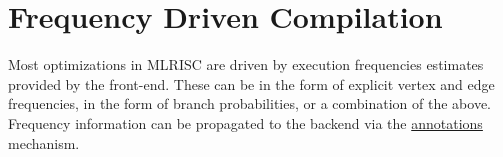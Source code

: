 \section{Frequency Driven Compilation}

Most optimizations in MLRISC are driven by execution frequencies
estimates provided by the front-end.  These can be in the form of explicit
vertex and edge frequencies, in the form of branch probabilities, or a
combination of the above.  Frequency information can be propagated
to the backend via the \href{annotations.html}{annotations} mechanism. 
